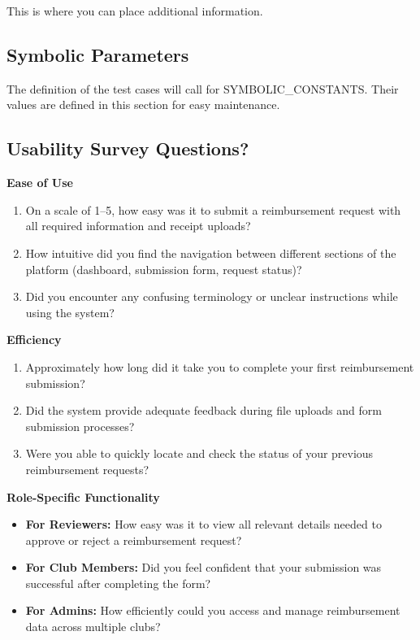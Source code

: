 \documentclass[12pt, titlepage]{article}
\begin{document}
This is where you can place additional information.

\subsection{Symbolic Parameters}

The definition of the test cases will call for SYMBOLIC\_CONSTANTS.
Their values are defined in this section for easy maintenance.

\subsection{Usability Survey Questions?}
  \textbf{Ease of Use}
  \begin{enumerate}
      \item On a scale of 1--5, how easy was it to submit a reimbursement request with all required information and receipt uploads?
      \item How intuitive did you find the navigation between different sections of the platform (dashboard, submission form, request status)?
      \item Did you encounter any confusing terminology or unclear instructions while using the system?
  \end{enumerate}

  \textbf{Efficiency}
  \begin{enumerate}
      \item Approximately how long did it take you to complete your first reimbursement submission?
      \item Did the system provide adequate feedback during file uploads and form submission processes?
      \item Were you able to quickly locate and check the status of your previous reimbursement requests?
  \end{enumerate}

  \textbf{Role-Specific Functionality}
  \begin{itemize}
      \item \textbf{For Reviewers:} How easy was it to view all relevant details needed to approve or reject a reimbursement request?
      \item \textbf{For Club Members:} Did you feel confident that your submission was successful after completing the form?
      \item \textbf{For Admins:} How efficiently could you access and manage reimbursement data across multiple clubs?
  \end{itemize}
\end{document}
